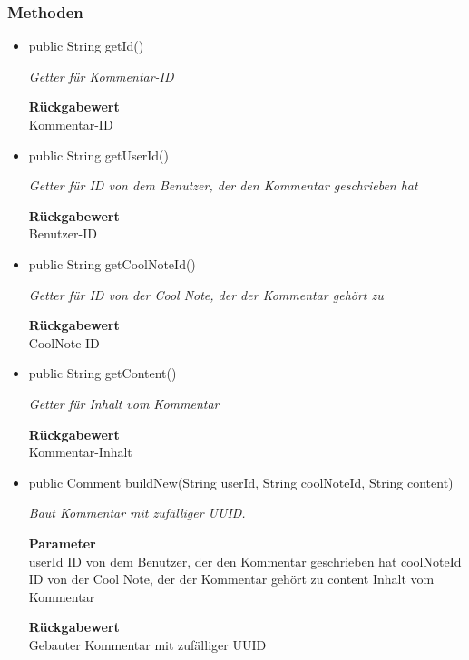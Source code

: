 \documentclass[a4paper]{scrreprt}
\begin{document}
        \subsubsection{Methoden}
        \begin{itemize}
        	\item{public String getId()}
        	
        	\textit{Getter für Kommentar-ID}
        	
        	
        	
        	\textbf{Rückgabewert} \\
        	Kommentar-ID        \item{public String getUserId()}
        	
        	\textit{Getter für ID von dem Benutzer, der den Kommentar geschrieben hat}
        	
        	
        	
        	\textbf{Rückgabewert} \\
        	Benutzer-ID        \item{public String getCoolNoteId()}
        	
        	\textit{Getter für ID von der Cool Note, der der Kommentar gehört zu}
        	
        	
        	
        	\textbf{Rückgabewert} \\
        	CoolNote-ID        \item{public String getContent()}
        	
        	\textit{Getter für Inhalt vom Kommentar}
        	
        	
        	
        	\textbf{Rückgabewert} \\
        	Kommentar-Inhalt        \item{public Comment buildNew(String userId, String coolNoteId, String content)}
        	
        	\textit{Baut Kommentar mit zufälliger UUID.}
        	
        	\textbf{Parameter} \\
        	userId ID von dem Benutzer, der den Kommentar geschrieben hat
        	coolNoteId ID von der Cool Note, der der Kommentar gehört zu
        	content Inhalt vom Kommentar
        	
        	\textbf{Rückgabewert} \\
        	Gebauter Kommentar mit zufälliger UUID
        \end{itemize}
\end{document}
